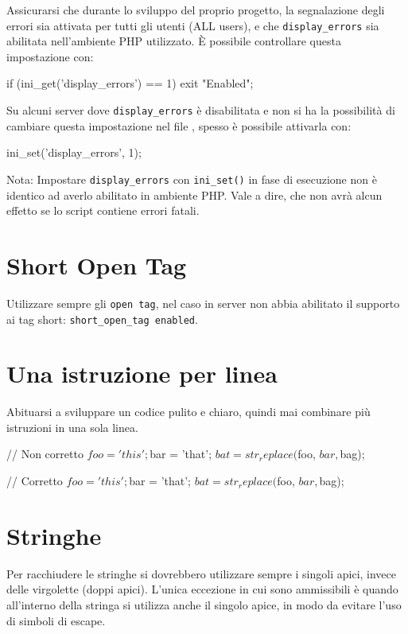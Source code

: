 Assicurarsi che durante lo sviluppo del proprio progetto, la segnalazione degli errori sia attivata per tutti gli utenti (ALL users), e che \verb|display_errors| sia abilitata nell'ambiente \ac{PHP} utilizzato. È possibile controllare questa impostazione con:

\begin{code}
if (ini_get('display_errors') == 1)
{
	exit "Enabled";
}
\end{code}

Su alcuni server dove \verb|display_errors| è disabilitata e non si ha la possibilità di cambiare questa impostazione nel file , spesso è possibile attivarla con:

\begin{code}
ini_set('display_errors', 1);
\end{code}

Nota: Impostare  \verb|display_errors| con \verb|ini_set()| in fase di esecuzione non è identico ad averlo abilitato in ambiente \ac{PHP}. Vale a dire, che non avrà alcun effetto se lo script contiene errori fatali.

\section*{Short Open Tag}
Utilizzare sempre gli \verb|open tag|, nel caso in server non abbia abilitato il supporto ai tag short: \verb|short_open_tag enabled|.


\section*{Una istruzione per linea}
Abituarsi a sviluppare un codice pulito e chiaro, quindi mai combinare più istruzioni in una sola linea.

\begin{code}
// Non corretto
$foo = 'this'; $bar = 'that'; $bat = str_replace($foo, $bar, $bag);

// Corretto
$foo = 'this';
$bar = 'that';
$bat = str_replace($foo, $bar, $bag);
\end{code}

\section*{Stringhe}
Per racchiudere le stringhe si dovrebbero utilizzare sempre i singoli apici, invece delle virgolette (doppi apici). L'unica eccezione in cui sono ammissibili è quando all'interno della stringa si utilizza anche il singolo apice, in modo da evitare l'uso di simboli di escape.

